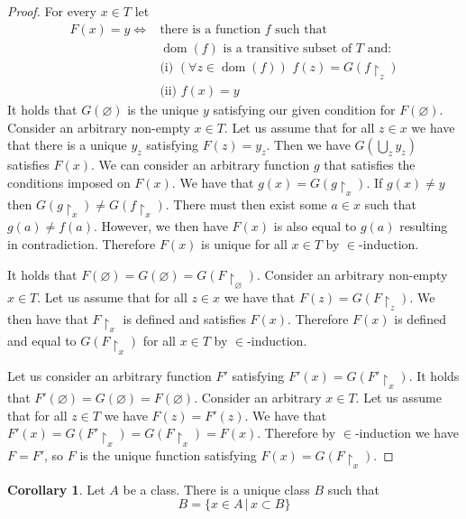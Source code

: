 \documentclass{article}
\theoremstyle{definition}
\newtheorem{crly}[thm]{Corollary}
\newcommand*{\mtset}{\ensuremath{\varnothing}}
\DeclareMathOperator{\dom}{dom}
\begin{document}
\begin{proof}
    For every $x \in T$ let 
    \begin{align*}
        F(x) = y \iff & \text{there is a function $f$ such that }    
        \\
        & \text{$\dom(f)$ is a transitive subset of $T$ and:}
        \\
        & \text{(i)} \, \, (\forall z \in \dom(f)) \, \, f(z) = G(f\restriction_z)
        \\
        & \text{(ii)} \, \, f(x) = y
    \end{align*}
    It holds that $G(\mtset)$ is the unique $y$ satisfying our given condition for $F(\mtset)$. Consider an arbitrary non-empty $x \in T$. Let us assume that for all $z \in x$ we have that there is a unique $y_z$ satisfying $F(z) = y_z$. Then we have $G(\bigcup_z y_z)$ satisfies $F(x)$. We can consider an arbitrary function $g$ that satisfies the conditions imposed on $F(x)$. We have that $g(x) = G(g\restriction_x)$. If $g(x) \ne y$ then $G(g\restriction_x) \ne G(f\restriction_x)$. There must then exist some $a \in x$ such that $g(a) \ne f(a)$. However, we then have $F(x)$ is also equal to $g(a)$ resulting in contradiction. Therefore $F(x)$ is unique for all $x \in T$ by $\in$-induction.

    It holds that $F(\mtset) = G(\mtset) = G(F\restriction_{\mtset})$. Consider an arbitrary non-empty $x \in T$. Let us assume that for all $z \in x$ we have that $F(z) = G(F\restriction_{z})$. We then have that $F\restriction_{x}$ is defined and satisfies $F(x)$. Therefore $F(x)$ is defined and equal to $G(F\restriction_{x})$ for all $x \in T$ by $\in$-induction.

    Let us consider an arbitrary function $F'$ satisfying $F'(x) = G(F'\restriction_x)$. It holds that $F'(\mtset) = G(\mtset) = F(\mtset)$. Consider an arbitrary $x \in T$. Let us assume that for all $z \in T$ we have $F(z) = F'(z)$. We have that $F'(x) = G(F'\restriction_x) = G(F\restriction_x) = F(x)$. Therefore by $\in$-induction we have $F = F'$, so $F$ is the unique function satisfying $F(x) = G(F\restriction_x)$.
\end{proof}

\begin{crly}
    Let $A$ be a class. There is a unique class $B$ such that 
    \[
        B = \{ x \in A \, | \, x \subset B \}
    \]
\end{crly}
\end{document}
